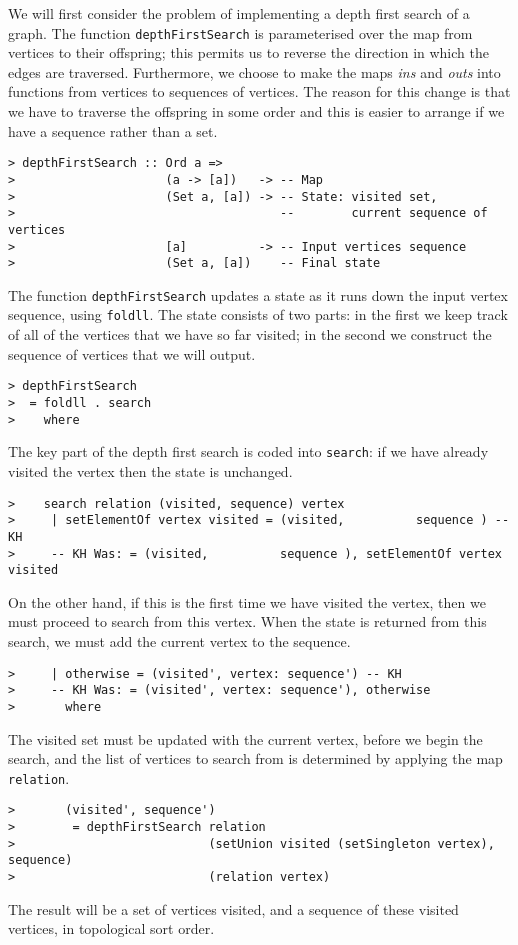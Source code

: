 We will first consider the problem of implementing a depth first
search of a graph. The function \mbox{\tt depthFirstSearch} is parameterised
over the map from vertices to their offspring; this permits us to
reverse the direction in which the edges are traversed.  Furthermore,
we choose to make the maps \mbox{\it ins} and \mbox{\it outs} into
functions from vertices to sequences of vertices.  The reason for this
change is that we have to traverse the offspring in some order and
this is easier to arrange if we have a sequence rather than a set.
\begin{verbatim}
> depthFirstSearch :: Ord a =>
>                     (a -> [a])   -> -- Map
>                     (Set a, [a]) -> -- State: visited set,
>                                     --        current sequence of vertices
>                     [a]          -> -- Input vertices sequence
>                     (Set a, [a])    -- Final state
\end{verbatim}
%
\par
The function \mbox{\tt depthFirstSearch} updates a state as it runs down the
input vertex sequence, using \mbox{\tt foldll}. The state consists of two
parts: in the first we keep track of all of the vertices that we have
so far visited; in the second we construct the sequence of vertices
that we will output.
\begin{verbatim}
> depthFirstSearch
>  = foldll . search
>    where
\end{verbatim}
\par
The key part of the depth first search is coded into \mbox{\tt search}: if we
have already visited the vertex then the state is unchanged.
\begin{verbatim}
>    search relation (visited, sequence) vertex
>     | setElementOf vertex visited = (visited,          sequence ) -- KH
>     -- KH Was: = (visited,          sequence ), setElementOf vertex visited
\end{verbatim}
On the other hand, if this is the first time we have visited the
vertex, then we must proceed to search from this vertex. When the
state is returned from this search, we must add the current vertex to
the sequence.
\begin{verbatim}
>     | otherwise = (visited', vertex: sequence') -- KH
>     -- KH Was: = (visited', vertex: sequence'), otherwise
>       where
\end{verbatim}
The visited set must be updated with the current vertex, before we
begin the search, and the list of vertices to search from is
determined by applying the map \mbox{\tt relation}.
\begin{verbatim}
>       (visited', sequence')
>        = depthFirstSearch relation
>                           (setUnion visited (setSingleton vertex), sequence)
>                           (relation vertex)
\end{verbatim}
The result will be a set of vertices visited, and a sequence of these
visited vertices, in topological sort order.

